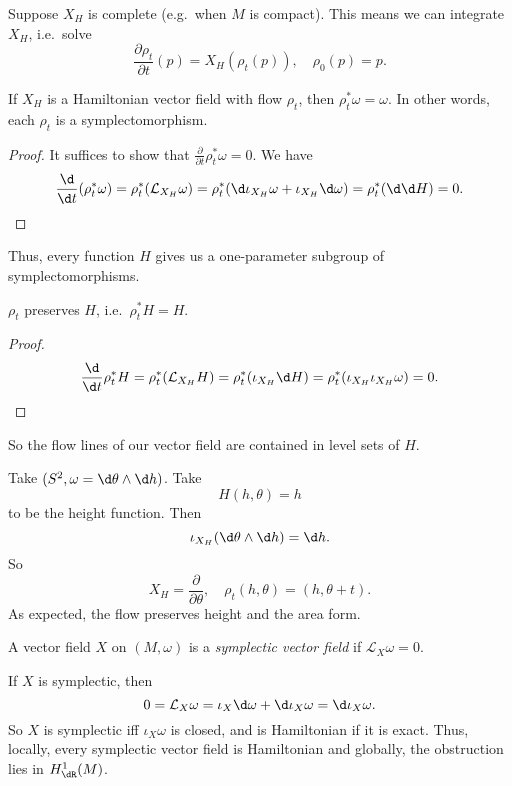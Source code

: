 \documentclass[a4paper]{article}
\begin{document}
Suppose $X_H$ is complete (e.g.\ when $M$ is compact). This means we can integrate $X_H$, i.e.\ solve
\[
  \frac{\partial \rho_t}{\partial t} (p) = X_H(\rho_t(p)),\quad \rho_0(p) = p.
\]
\begin{prop}
  If $X_H$ is a Hamiltonian vector field with flow $\rho_t$, then $\rho_t^* \omega = \omega$. In other words, each $\rho_t$ is a symplectomorphism.
\end{prop}

\begin{proof}
  It suffices to show that $\frac{\partial}{\partial t} \rho_t^* \omega = 0$. We have
  \[
    \frac{\d}{\d t} (\rho_t^* \omega) = \rho_t^* (\mathcal{L}_{X_H} \omega) = \rho_t^* (\d \iota_{X_H} \omega + \iota_{X_H} \d \omega) = \rho_t^* (\d \d H) = 0.\qedhere
  \]
\end{proof}

Thus, every function $H$ gives us a one-parameter subgroup of symplectomorphisms.

\begin{prop}
  $\rho_t$ preserves $H$, i.e.\ $\rho_t^* H = H$.
\end{prop}

\begin{proof}
  \[
    \frac{\d}{\d t} \rho_t^* H = \rho_t^* (\mathcal{L}_{X_H}H) = \rho_t^* (\iota_{X_H} \d H) = \rho_t^* (\iota_{X_H} \iota_{X_H}\omega) = 0.\qedhere
  \]
\end{proof}

So the flow lines of our vector field are contained in level sets of $H$.
\begin{eg}
  Take $(S^2, \omega = \d \theta \wedge \d h)$. Take
  \[
    H(h, \theta) = h
  \]
  to be the height function. Then
  \[
    \iota_{X_H} (\d \theta \wedge \d h) = \d h.
  \]
  So
  \[
    X_H = \frac{\partial}{\partial \theta},\quad \rho_t(h, \theta) = (h, \theta + t).
  \]
  As expected, the flow preserves height and the area form.
\end{eg}

\begin{defi}
  A vector field $X$ on $(M, \omega)$ is a \emph{symplectic vector field} if $\mathcal{L}_X \omega = 0$.
\end{defi}
If $X$ is symplectic, then
\[
  0 = \mathcal{L}_X \omega= \iota_X \d \omega + \d \iota_X \omega = \d \iota_X \omega.
\]
So $X$ is symplectic iff $\iota_X \omega$ is closed, and is Hamiltonian if it is exact. Thus, locally, every symplectic vector field is Hamiltonian and globally, the obstruction lies in $H^1_{\dR}(M)$.
\end{document}
